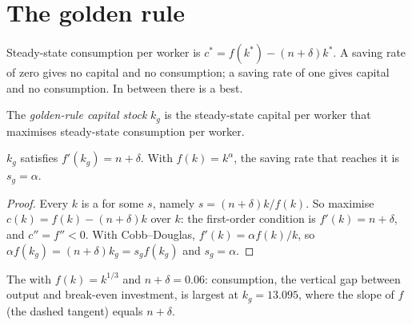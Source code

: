 \section{The golden rule}\label{sec:b1:solow-model:golden}

Steady-state consumption per worker is $c^* = f(k^*) - (n + \delta)k^*$. A saving rate
of zero gives no capital and no consumption; a saving rate of one gives
capital and no consumption. In between there is a best.

\begin{definition}\label{def:b1:solow-model:golden-rule}
The \emph{golden-rule capital stock} $k_g$ is the steady-state capital per
worker that maximises steady-state consumption per worker.
\end{definition}

\begin{proposition}\label{prop:b1:solow-model:golden}
$k_g$ satisfies $f'(k_g) = n + \delta$. With $f(k) = k^{\alpha}$, the saving rate that reaches it
is $s_g = \alpha$.
\end{proposition}

\begin{proof}
Every $k$ is a  for some $s$, namely $s = (n + \delta)k/f(k)$. So maximise
$c(k) = f(k) - (n + \delta)k$ over $k$: the first-order condition is $f'(k) = n + \delta$, and
$c'' = f'' < 0$. With Cobb--Douglas, $f'(k) = \alpha f(k)/k$, so $\alpha f(k_g) = (n + \delta)k_g = s_g f(k_g)$ and
$s_g = \alpha$.
\end{proof}

\begin{omfigure}

{\small The  with $f(k) = k^{1/3}$ and $n + \delta = 0.06$: consumption, the
vertical gap between output and break-even investment, is largest at
$k_g = 13.095$, where the slope of $f$ (the dashed tangent) equals $n + \delta$.}
\end{omfigure}

